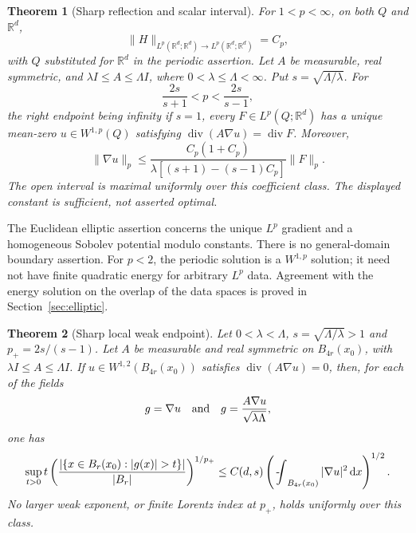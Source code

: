 \documentclass[11pt,a4paper]{article}
\numberwithin{equation}{section}
\newtheorem{theorem}{Theorem}[section]
\theoremstyle{definition}
\theoremstyle{remark}\newtheorem{remark}[theorem]{Remark}
\DeclareMathOperator{\diver}{div}
\newcommand{\R}{\mathbb R}
\newcommand{\Id}{I}
\newcommand{\dd}{\,\mathrm dx}
\newcommand{\norm}[1]{\lVert #1\rVert}
\newcommand{\fint}{\mathop{\rlap{\kern.18em-}\int}\nolimits}
\begin{document}
\begin{theorem}[Sharp reflection and scalar interval]\label{thm:main-power}
For \(1<p<\infty\), on both \(Q\) and \(\R^d\),
\[
 \norm H_{L^p(\R^d;\R^d)\to L^p(\R^d;\R^d)}=C_p,
\]
with \(Q\) substituted for \(\R^d\) in the periodic assertion.
Let \(A\) be measurable, real symmetric, and
\(\lambda\Id\leq A\leq\Lambda\Id\), where \(0<\lambda\leq\Lambda<\infty\).
Put \(s=\sqrt{\Lambda/\lambda}\). For
\begin{equation}\label{eq:sharp-interval}
 \frac{2s}{s+1}<p<\frac{2s}{s-1},
\end{equation}
the right endpoint being infinity if \(s=1\), every \(F\in L^p(Q;\R^d)\)
has a unique mean-zero \(u\in W^{1,p}(Q)\) satisfying
\(\diver(A\nabla u)=\diver F\). Moreover,
\begin{equation}\label{eq:main-elliptic-bound}
 \norm{\nabla u}_p\leq
 \frac{C_p(1+C_p)}
 {\lambda[(s+1)-(s-1)C_p]}\norm F_p.
\end{equation}
The open interval is maximal uniformly over this coefficient class.
The displayed constant is sufficient, not asserted optimal.
\end{theorem}

The Euclidean elliptic assertion concerns the unique \(L^p\) gradient and a
homogeneous Sobolev potential modulo constants. There is no general-domain
boundary assertion. For \(p<2\), the periodic solution is a \(W^{1,p}\)
solution; it need not have finite quadratic energy for arbitrary \(L^p\)
data. Agreement with the energy solution on the overlap of the data spaces
is proved in Section~\ref{sec:elliptic}.

\begin{theorem}[Sharp local weak endpoint]\label{thm:main-weak}
Let \(0<\lambda<\Lambda\), \(s=\sqrt{\Lambda/\lambda}>1\) and
\(p_+=2s/(s-1)\). Let \(A\) be measurable and real symmetric on
\(B_{4r}(x_0)\), with \(\lambda\Id\leq A\leq\Lambda\Id\).
If \(u\in W^{1,2}(B_{4r}(x_0))\) satisfies
\(\diver(A\nabla u)=0\), then, for each of the fields
\[
 g=\nabla u\quad\hbox{and}\quad
 g=\frac{A\nabla u}{\sqrt{\lambda\Lambda}},
\]
one has
\begin{equation}\label{eq:main-weak}
 \sup_{t>0}t
 \left(\frac{|\{x\in B_r(x_0):|g(x)|>t\}|}{|B_r|}\right)^{1/p_+}
 \leq C(d,s)
       \left(\fint_{B_{4r}(x_0)}|\nabla u|^2\dd\right)^{1/2}.
\end{equation}
No larger weak exponent, or finite Lorentz index at \(p_+\),
holds uniformly over this class.
\end{theorem}
\end{document}
